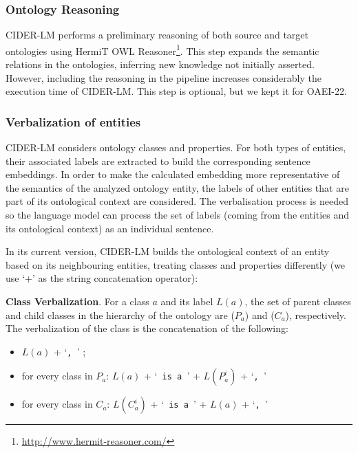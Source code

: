 \documentclass[
]{ceurart}
\begin{document}
\subsubsection{Ontology Reasoning}

CIDER-LM performs a preliminary reasoning of both source and target ontologies using HermiT OWL Reasoner\footnote{\url{http://www.hermit-reasoner.com/}}. This step expands the semantic relations in the ontologies, inferring new knowledge not initially asserted. However, including the reasoning in the pipeline increases considerably the execution time of CIDER-LM. This step is optional, but we kept it for OAEI-22.  

\subsubsection{Verbalization of entities}
CIDER-LM considers ontology classes and properties. For both types of entities, their associated labels are extracted to build the corresponding sentence embeddings. 
In order to make the calculated embedding more representative of the semantics of the analyzed ontology entity, the labels of other entities that are part of its ontological context are considered. The verbalisation process is needed so the language model can process the set of labels (coming from the entities and its ontological context) as an individual sentence.

In its current version, CIDER-LM builds the ontological context of an entity based on its neighbouring entities, treating classes and properties differently (we use `+' as the string concatenation operator):

\textbf{Class Verbalization}. For a class $a$ and its label $L(a)$, the set of parent classes and child classes in the hierarchy of the ontology are ($P_a$) and ($C_a$), respectively. The verbalization of the class is the concatenation of the following:

\begin{itemize}
    \item $L(a)$ + `\verb|, |' ;
    \item for every class in $P_a$: $L(a)$ + `\verb| is a |' + $L(P_a^i)$ + `\verb|, |' 
    \item for every class in $C_a$: $L(C_a^i)$ + `\verb| is a |' + $L(a)$ + `\verb|, |' 
\end{itemize}
\end{document}
